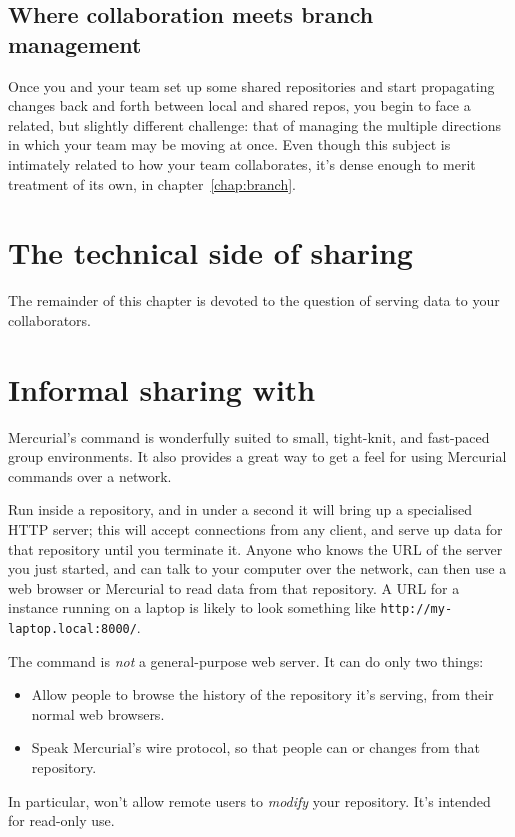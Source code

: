 \subsection{Where collaboration meets branch management}

Once you and your team set up some shared repositories and start
propagating changes back and forth between local and shared repos, you
begin to face a related, but slightly different challenge: that of
managing the multiple directions in which your team may be moving at
once.  Even though this subject is intimately related to how your team
collaborates, it's dense enough to merit treatment of its own, in
chapter~\ref{chap:branch}.

\section{The technical side of sharing}

The remainder of this chapter is devoted to the question of serving
data to your collaborators.

\section{Informal sharing with }
\label{sec:collab:serve}

Mercurial's  command is wonderfully suited to small,
tight-knit, and fast-paced group environments.  It also provides a
great way to get a feel for using Mercurial commands over a network.

Run  inside a repository, and in under a second it will
bring up a specialised HTTP server; this will accept connections from
any client, and serve up data for that repository until you terminate
it.  Anyone who knows the URL of the server you just started, and can
talk to your computer over the network, can then use a web browser or
Mercurial to read data from that repository.  A URL for a
 instance running on a laptop is likely to look something
like \Verb|http://my-laptop.local:8000/|.

The  command is \emph{not} a general-purpose web server.
It can do only two things:
\begin{itemize}
\item Allow people to browse the history of the repository it's
  serving, from their normal web browsers.
\item Speak Mercurial's wire protocol, so that people can
   or  changes from that repository.
\end{itemize}
In particular,  won't allow remote users to \emph{modify}
your repository.  It's intended for read-only use.

